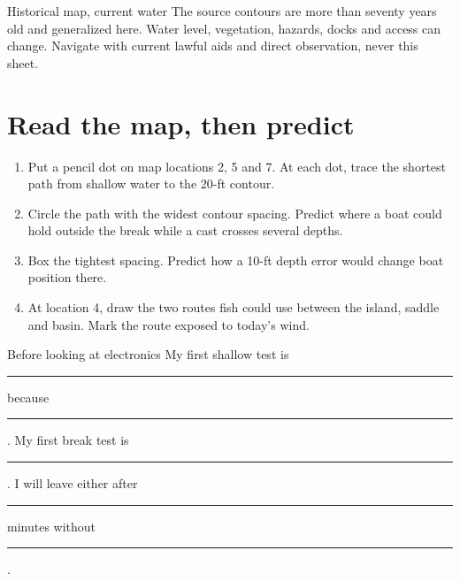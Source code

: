\begin{teloshazard}{Historical map, current water}
The source contours are more than seventy years old and generalized here.
Water level, vegetation, hazards, docks and access can change. Navigate with
current lawful aids and direct observation, never this sheet.
\end{teloshazard}

\newpage
\section{Read the map, then predict}

\begin{center}
\end{center}

\begin{enumerate}
\item Put a pencil dot on map locations 2, 5 and 7. At each dot, trace the
shortest path from shallow water to the 20-ft contour.
\item Circle the path with the widest contour spacing. Predict where a boat
could hold outside the break while a cast crosses several depths.
\item Box the tightest spacing. Predict how a 10-ft depth error would change
boat position there.
\item At location 4, draw the two routes fish could use between the island,
saddle and basin. Mark the route exposed to today's wind.
\end{enumerate}

\begin{teloscard}{Before looking at electronics}
My first shallow test is \rule{1.8in}{.4pt} because
\rule{2.5in}{.4pt}. My first break test is \rule{1.8in}{.4pt}.
I will leave either after \rule{.55in}{.4pt} minutes without
\rule{1.6in}{.4pt}.
\end{teloscard}

